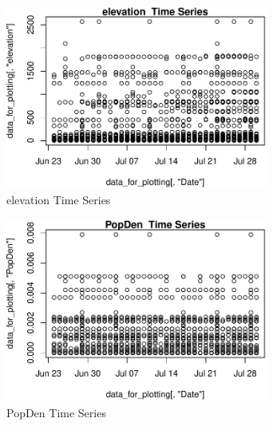 \begin{figure} 
\centering  
\includegraphics[width=0.77\textwidth]{Code_Outputs/ML_input_report_AllforCaret_cleaned_StepPractice_part_practice_elevationTS.pdf} 
\caption{\label{fig:ML_input_report_AllforCaret_cleaned_StepPractice_part_practiceelevationTS}elevation  Time Series} 
\end{figure} 
 

\begin{figure} 
\centering  
\includegraphics[width=0.77\textwidth]{Code_Outputs/ML_input_report_AllforCaret_cleaned_StepPractice_part_practice_PopDenTS.pdf} 
\caption{\label{fig:ML_input_report_AllforCaret_cleaned_StepPractice_part_practicePopDenTS}PopDen  Time Series} 
\end{figure} 
 
